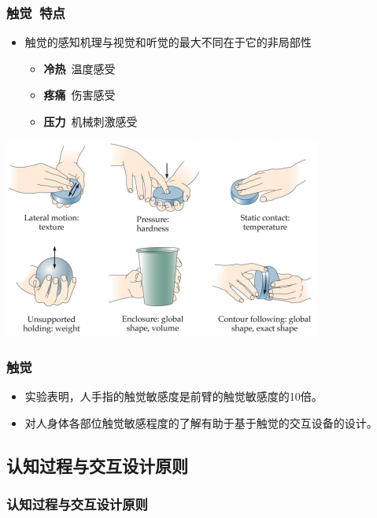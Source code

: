 \documentclass{beamer}
\begin{document}
\begin{frame}
	\frametitle{触觉~{\small 特点}}
	\begin{itemize}
		\item 触觉的感知机理与视觉和听觉的最大不同在于它的非局部性
		\begin{itemize}
			\item \textbf{冷热}~温度感受
			\item \textbf{疼痛}~伤害感受
			\item \textbf{压力}~机械刺激感受
		\end{itemize}
	\end{itemize}
	\transdissolve\pause
	\begin{center}
		\includegraphics[scale=.5]{images/tactile-sensitivity.png}
	\end{center}
\end{frame}

\begin{frame}
	\frametitle{触觉}
	\begin{itemize}
		\item 实验表明，人手指的触觉敏感度是前臂的触觉敏感度的10倍。
		\item 对人身体各部位触觉敏感程度的了解有助于基于触觉的交互设备的设计。
	\end{itemize}
\end{frame}

\subsection{认知过程与交互设计原则}
\begin{frame}
	\frametitle{认知过程与交互设计原则}
	\begin{columns}
		\column{4cm}
		\column{6cm}
	\end{columns}
\end{frame}
\end{document}
